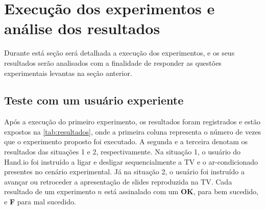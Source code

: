 
\section{Execução dos experimentos e análise dos resultados} \label{Sect:ExecExperi}

Durante está seção será detalhada a execução dos experimentos, e os seus resultados serão analisados com a finalidade de responder as questões experimentais levantas na seção anterior.


\subsection{Teste com um usuário experiente}

Após a execução do primeiro experimento, os resultados foram registrados e estão expostos na \autoref{tab:resultados}, onde a primeira coluna representa o número de vezes que o experimento proposto foi executado. A segunda e a terceira denotam os resultados das situações 1 e 2, respectivamente. Na situação 1, o usuário do Hand.io foi instruído a ligar e desligar sequencialmente a TV e o ar-condicionado presentes no cenário experimental. Já na situação 2, o usuário foi instruído a avançar ou retroceder a apresentação de slides reproduzida na TV. Cada resultado de um experimento $n$ está assinalado com um \textbf{OK}, para bem sucedido, e \textbf{F} para mal sucedido. 

